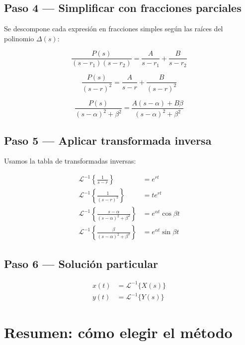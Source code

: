 \documentclass[9pt,a4paper]{article}
\begin{document}
\subsection{Paso 4 --- Simplificar con fracciones parciales}

Se descompone cada expresión en fracciones simples según las raíces del polinomio \(\Delta(s)\):

\[
\frac{P(s)}{(s - r_1)(s - r_2)} = \frac{A}{s - r_1} + \frac{B}{s - r_2}
\]

\[
\frac{P(s)}{(s - r)^2} = \frac{A}{s - r} + \frac{B}{(s - r)^2}
\]

\[
\frac{P(s)}{(s - \alpha)^2 + \beta^2} = \frac{A(s - \alpha) + B\beta}{(s - \alpha)^2 + \beta^2}
\]

\subsection{Paso 5 --- Aplicar transformada inversa}

Usamos la tabla de transformadas inversas:

\[
\begin{aligned}
\mathcal{L}^{-1}\left\{\frac{1}{s - r}\right\} &= e^{r t} \\[2pt]
\mathcal{L}^{-1}\left\{\frac{1}{(s - r)^2}\right\} &= t e^{r t} \\[2pt]
\mathcal{L}^{-1}\left\{\frac{s - \alpha}{(s - \alpha)^2 + \beta^2}\right\} &= e^{\alpha t}\cos\beta t \\[2pt]
\mathcal{L}^{-1}\left\{\frac{\beta}{(s - \alpha)^2 + \beta^2}\right\} &= e^{\alpha t}\sin\beta t
\end{aligned}
\]

\subsection{Paso 6 --- Solución particular}

\[
\boxed{
\begin{aligned}
x(t) &= \mathcal{L}^{-1}\{X(s)\} \\
y(t) &= \mathcal{L}^{-1}\{Y(s)\}
\end{aligned}
}
\]

\section*{Resumen: cómo elegir el método}
\end{document}
